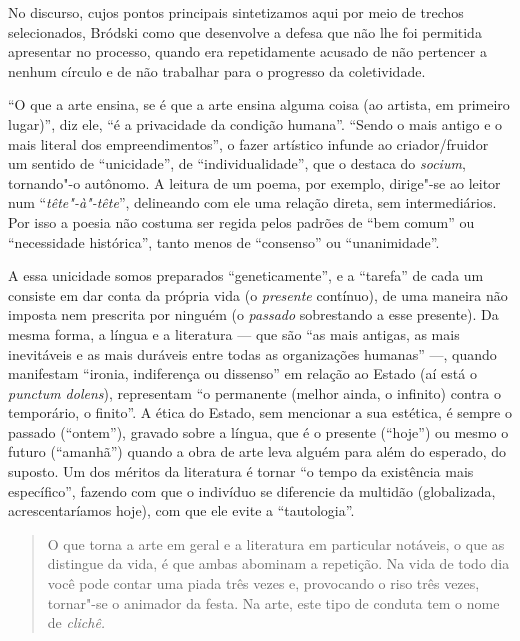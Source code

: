 No discurso, cujos pontos principais sintetizamos aqui por meio de trechos selecionados, Bródski como que desenvolve a defesa que não lhe foi permitida apresentar no processo,
quando era repetidamente acusado de não pertencer a nenhum círculo e de
não trabalhar para o progresso da coletividade.

``O que a arte ensina, se é que a arte ensina alguma coisa (ao
artista, em primeiro lugar)'', diz ele, ``é a privacidade da
condição humana''. ``Sendo o mais antigo e o mais literal dos
empreendimentos'', o fazer artístico infunde ao criador/fruidor um sentido de
``unicidade'', de ``individualidade'', que o destaca do \emph{socium}, tornando"-o
autônomo. A leitura de um poema, por exemplo, dirige"-se ao leitor num
``\emph{tête"-à"-tête}'', delineando com ele uma relação direta, sem
intermediários. Por isso a poesia não costuma ser regida pelos padrões
de ``bem comum'' ou ``necessidade histórica'', tanto menos de
``consenso'' ou ``unanimidade''.

A essa unicidade somos preparados ``geneticamente'', e a ``tarefa'' de cada um
consiste em dar conta da própria vida (o \emph{presente} contínuo), de
uma maneira não imposta nem prescrita por ninguém (o \emph{passado}
sobrestando a esse presente). Da mesma forma, a língua e
a literatura --- que são ``as mais antigas, as mais
inevitáveis e as mais duráveis entre todas as organizações humanas'' ---,
quando manifestam ``ironia, indiferença ou dissenso'' em relação ao Estado
(aí está o \emph{punctum dolens}), representam ``o permanente (melhor ainda, o infinito) contra o temporário, o finito''. A ética do
Estado, sem mencionar a sua estética, é sempre o passado (``ontem''), gravado
sobre a língua, que é o presente (``hoje'') ou mesmo o futuro (``amanhã'') quando a obra de arte
leva alguém para além do esperado, do
suposto. Um dos méritos da literatura é tornar ``o tempo da existência
mais específico'', fazendo com que o indivíduo se diferencie da multidão
(globalizada, acrescentaríamos hoje), com que ele evite a ``tautologia''.

\begin{quotation}
O que torna a arte em geral e a literatura em particular
notáveis, o que as distingue da vida, é que ambas abominam a repetição. Na vida de todo dia você pode
contar uma piada três vezes e, provocando o riso três vezes, tornar"-se o
animador da festa. Na arte, este tipo de conduta tem o nome de
\emph{clichê.}
\end{quotation}

